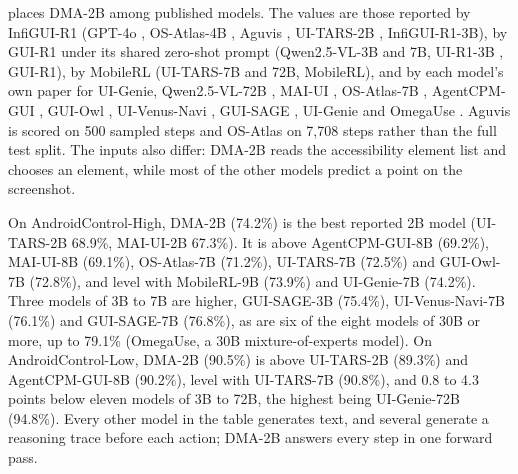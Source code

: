 \documentclass{article}
\newcommand{\ours}{DMA-2B}
\begin{document}
 places \ours{} among published models. The values are those reported by InfiGUI-R1
\citep{infiguir1} (GPT-4o \citep{gpt4o}, OS-Atlas-4B \citep{osatlas}, Aguvis \citep{aguvis}, UI-TARS-2B
\citep{uitars2025}, InfiGUI-R1-3B), by GUI-R1 under its shared zero-shot prompt \citep{guir1} (Qwen2.5-VL-3B and
7B, UI-R1-3B \citep{uir1}, GUI-R1), by MobileRL \citep{mobilerl2025} (UI-TARS-7B and 72B,
MobileRL), and by each model's own paper for UI-Genie, Qwen2.5-VL-72B \citep{qwen25vl}, MAI-UI \citep{maiui2025}, OS-Atlas-7B
\citep{osatlas}, AgentCPM-GUI \citep{agentcpmgui2025}, GUI-Owl \citep{mobileagentv3}, UI-Venus-Navi
\citep{uivenus2025}, GUI-SAGE \citep{guisage2026}, UI-Genie \citep{uigenie} and OmegaUse \citep{omegause2026}.
Aguvis is scored on 500 sampled steps and OS-Atlas on 7{,}708 steps rather than the full test split. The inputs also differ: \ours{} reads the accessibility element list
and chooses an element, while most of the other models predict a point on the screenshot.

On AndroidControl-High, \ours{} (74.2\%) is the best reported 2B model (UI-TARS-2B 68.9\%, MAI-UI-2B 67.3\%). It is
above AgentCPM-GUI-8B (69.2\%), MAI-UI-8B (69.1\%), OS-Atlas-7B (71.2\%), UI-TARS-7B (72.5\%) and GUI-Owl-7B
(72.8\%), and level with MobileRL-9B (73.9\%) and UI-Genie-7B (74.2\%). Three models of 3B to 7B are higher,
GUI-SAGE-3B (75.4\%), UI-Venus-Navi-7B (76.1\%) and GUI-SAGE-7B (76.8\%), as are six of the eight models of 30B or
more, up to 79.1\% (OmegaUse, a 30B mixture-of-experts model). On AndroidControl-Low, \ours{} (90.5\%) is above
UI-TARS-2B (89.3\%) and AgentCPM-GUI-8B (90.2\%), level with UI-TARS-7B (90.8\%), and 0.8 to 4.3 points below eleven
models of 3B to 72B, the highest being UI-Genie-72B (94.8\%). Every other model in
the table generates text, and several generate a reasoning trace before each action; \ours{} answers every step in
one forward pass.
\end{document}
